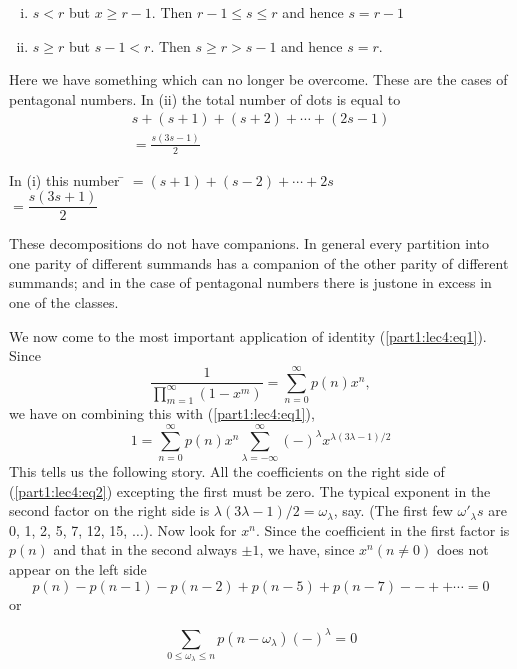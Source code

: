 \begin{enumerate}[(i)]
\item $s<r$ but $x \geq r-1$. Then $r-1 \leq s \leq r$ and hence
  $s=r-1$
\item $s \geq r$ but $s- 1< r$. Then $s \geq r> s-1$ and hence $s=r$.
\end{enumerate}

Here we have something which can no longer be overcome. These are the
cases of pentagonal numbers. In (ii) the total number of dots is equal
to 
\begin{gather*}
  s+ (s+1) + (s+2) + \cdots + (2s-1)\\
  = \frac{s(3 s-1)}{2}
\end{gather*}
\begin{tabbing}
  In (i) this number \= $= (s+1)+ (s-2)+ \cdots + 2 s$\\
  \> $= \dfrac{s(3s+1)}{2}$
\end{tabbing}

These decompositions do not have companions. In general every
partition into one parity of different summands has a companion of the
other parity of different summands; and in the case of pentagonal
numbers there is just\pageoriginale  one in excess in one of the classes.

We now come to the most important application of identity
(\ref{part1:lec4:eq1}). Since 
$$
\frac{1}{\prod^\infty_{m=1} (1-x^m)}= \sum^\infty_{n=0} p(n) x^n,
$$ 
we have on combining this with (\ref{part1:lec4:eq1}),
\begin{equation*}
  1= \sum^\infty_{n=0} p(n) x^n \sum^\infty_{\lambda=-\infty}
  (-)^\lambda x^{\lambda (3 \lambda -1)/2} \tag{2}\label{part1:lec4:eq2}
\end{equation*}
This tells us the following story. All the coefficients on the right
side of (\ref{part1:lec4:eq2}) excepting the first must be zero. The typical exponent in
the second factor on the right side is $\lambda (3 \lambda-1)/2=
\omega_\lambda$, say. (The first few $\omega'_\lambda s$ are 0, 1, 2, 5,
 7, 12, 15, $\ldots$). Now look for $x^n$. Since the coefficient in
the first factor is $p(n)$ and that in the second always $\pm 1$, we
have, since $x^n (n \neq 0)$ does not appear on the left side
\begin{equation*}
  p(n) - p(n-1)- p(n-2)+ p(n-5) + p(n-7) -- ++ \cdots
  =0
\end{equation*}
or 

\begin{equation*}
  \sum_{0 \leq \omega_\lambda \leq n} p(n-
  \omega_\lambda) (-)^\lambda= 0 \tag{3}\label{part1:lec4:eq3}
\end{equation*}

